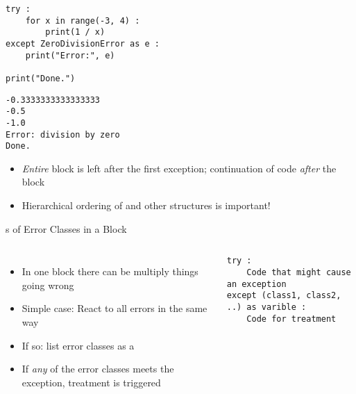 \begin{frame}[fragile]
%
\begin{tcbraster}[raster columns=2,
                  raster equal height,
                  nobeforeafter,
                  raster column skip=0.5cm]
\begin{codebox}
\begin{verbatim}
try :
    for x in range(-3, 4) :
        print(1 / x)
except ZeroDivisionError as e :
    print("Error:", e)

print("Done.")
\end{verbatim}
\end{codebox}
%
\begin{cmdbox}
\begin{verbatim}
-0.3333333333333333
-0.5
-1.0
Error: division by zero
Done.
\end{verbatim}
\end{cmdbox}
\end{tcbraster}
%
\begin{center}
\begin{itemize}
\item[\Thus] \emph{Entire}  block is left after the first exception; continuation of code \emph{after} the  block
\item[\Thus] Hierarchical ordering of  and other structures is important!
\end{itemize}
\end{center}
%
\end{frame}


\begin{frame}[fragile]{s of Error Classes in a  Block}
%
\begin{columns}[T]
\begin{itemize}
\item In one  block there can be multiply things going wrong
\item Simple case: React to all errors in the same way
\item If so: list error classes as a 
\item[\Thus] If \emph{any} of the error classes meets the exception, treatment is triggered
\end{itemize}
%
\begin{codebox}
\begin{verbatim}
try :
    Code that might cause an exception
except (class1, class2, ..) as varible :
    Code for treatment
\end{verbatim}
\end{codebox}
\end{columns}
%
\end{frame}

